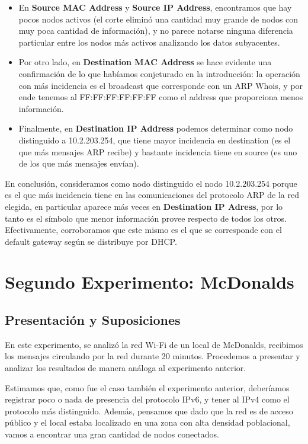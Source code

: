 \documentclass{article}
\theoremstyle{definition}
\theoremstyle{remark}
\begin{document}
\begin{itemize}
 
\item En \textbf{Source MAC Address} y \textbf{Source IP Address}, encontramos que hay pocos nodos activos (el corte eliminó una cantidad muy grande de nodos con muy poca cantidad de información), y no parece notarse ninguna diferencia particular entre los nodos más activos analizando los datos subyacentes.

\item Por otro lado, en \textbf{Destination MAC Address} se hace evidente una confirmación de lo que habíamos conjeturado en la introducción: la operación con más incidencia es el broadcast que corresponde con un ARP Whois, y por ende tenemos al FF:FF:FF:FF:FF:FF como el address que proporciona menos información.

\item Finalmente, en \textbf{Destination IP Address} podemos determinar como nodo distinguido a 10.2.203.254, que tiene mayor incidencia en destination (es el que más mensajes ARP recibe) y bastante incidencia tiene en source (es uno de los que más mensajes envían). 

\end{itemize}

En conclusión, consideramos como nodo distinguido el nodo 10.2.203.254 porque es el que más incidencia tiene en las comunicaciones del protocolo ARP de la red elegida, en particular aparece más veces en \textbf{Destination IP Adress}, por lo tanto es el símbolo que menor información provee respecto de todos los otros. Efectivamente, corroboramos que este mismo es el que se corresponde con el default gateway según se distribuye por DHCP.

\newpage
\section{Segundo Experimento: McDonalds}

\subsection{Presentación y Suposiciones}

En este experimento, se analizó la red Wi-Fi de un local de McDonalds, recibimos los mensajes circulando por la red durante 20 minutos. Procedemos a presentar y analizar los resultados de manera análoga al experimento anterior.

Estimamos que, como fue el caso también el experimento anterior, deberíamos registrar poco o nada de presencia del protocolo IPv6, y tener al IPv4 como el protocolo más distinguido. Además, pensamos que dado que la red es de acceso público y el local estaba localizado en una zona con alta densidad poblacional, vamos a encontrar una gran cantidad de nodos conectados.
\end{document}
